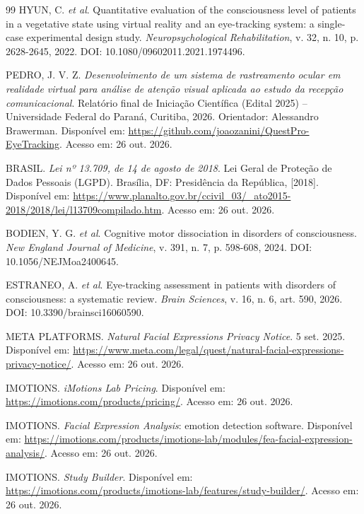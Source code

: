 \documentclass[conference,a4paper,10pt]{IEEEtran}
\begin{document}
\begin{thebibliography}{99}
 HYUN, C. \textit{et al}. Quantitative evaluation of the consciousness level of patients in a vegetative state using virtual reality and an eye-tracking system: a single-case experimental design study. \textit{Neuropsychological Rehabilitation}, v. 32, n. 10, p. 2628-2645, 2022. DOI: 10.1080/09602011.2021.1974496.

 PEDRO, J. V. Z. \textit{Desenvolvimento de um sistema de rastreamento ocular em realidade virtual para análise de atenção visual aplicada ao estudo da recepção comunicacional}. Relatório final de Iniciação Científica (Edital 2025) -- Universidade Federal do Paraná, Curitiba, 2026. Orientador: Alessandro Brawerman. Disponível em: \url{https://github.com/joaozanini/QuestPro-EyeTracking}. Acesso em: 26 out. 2026.

 BRASIL. \textit{Lei nº 13.709, de 14 de agosto de 2018}. Lei Geral de Proteção de Dados Pessoais (LGPD). Brasília, DF: Presidência da República, [2018]. Disponível em: \url{https://www.planalto.gov.br/ccivil_03/_ato2015-2018/2018/lei/l13709compilado.htm}. Acesso em: 26 out. 2026.

 BODIEN, Y. G. \textit{et al}. Cognitive motor dissociation in disorders of consciousness. \textit{New England Journal of Medicine}, v. 391, n. 7, p. 598-608, 2024. DOI: 10.1056/NEJMoa2400645.

 ESTRANEO, A. \textit{et al}. Eye-tracking assessment in patients with disorders of consciousness: a systematic review. \textit{Brain Sciences}, v. 16, n. 6, art. 590, 2026. DOI: 10.3390/brainsci16060590.

 META PLATFORMS. \textit{Natural Facial Expressions Privacy Notice}. 5 set. 2025. Disponível em: \url{https://www.meta.com/legal/quest/natural-facial-expressions-privacy-notice/}. Acesso em: 26 out. 2026.

 IMOTIONS. \textit{iMotions Lab Pricing}. Disponível em: \url{https://imotions.com/products/pricing/}. Acesso em: 26 out. 2026.

 IMOTIONS. \textit{Facial Expression Analysis}: emotion detection software. Disponível em: \url{https://imotions.com/products/imotions-lab/modules/fea-facial-expression-analysis/}. Acesso em: 26 out. 2026.

 IMOTIONS. \textit{Study Builder}. Disponível em: \url{https://imotions.com/products/imotions-lab/features/study-builder/}. Acesso em: 26 out. 2026.


\end{thebibliography}
\end{document}
